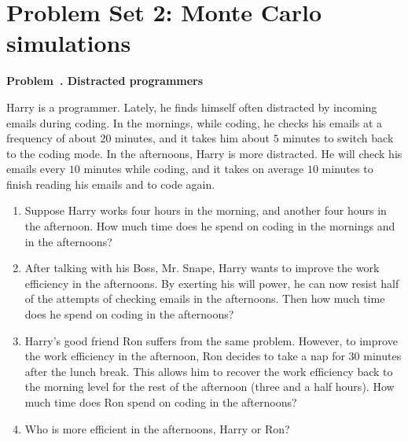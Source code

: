 \documentclass[12pt]{article}
\newcounter{problem}[section]
\newenvironment{problem}[1]
{
  \refstepcounter{problem}\par\bigskip
  \textbf{\large Problem~\theproblem. #1}
  \par\medskip
}
{ \medskip }
\begin{document}
\section{Problem Set 2: Monte Carlo simulations}


\begin{problem}{Distracted programmers}


Harry is a programmer.
%
Lately, he finds himself often distracted by
incoming emails during coding.
%
In the mornings,
while coding,
he checks his emails at a frequency of about $20$ minutes,
and it takes him about $5$ minutes to switch back to
the coding mode.
%
In the afternoons, Harry is more distracted.
%
He will check his emails every $10$ minutes while coding,
and it takes on average $10$ minutes
to finish reading his emails and to code again.

\begin{enumerate}
  \item
    Suppose Harry works four hours in the morning,
    and another four hours in the afternoon.
    How much time does he spend on coding
    in the mornings and in the afternoons?

  \item
    After talking with his Boss, Mr. Snape,
    Harry wants to improve the work efficiency
    in the afternoons.
    By exerting his will power,
    he can now resist half of the attempts of checking emails
    in the afternoons.
    Then how much time does he spend on coding
    in the afternoons?

  \item
    Harry's good friend Ron
    suffers from the same problem.
    However,
    to improve the work efficiency in the afternoon,
    Ron decides to take a nap for $30$ minutes
    after the lunch break.
    This allows him to recover the work efficiency
    back to the morning level
    for the rest of the afternoon
    (three and a half hours).
    How much time does Ron spend on coding
    in the afternoons?

  \item
    Who is more efficient in the afternoons, Harry or Ron?
\end{enumerate}

\end{problem}
\end{document}
